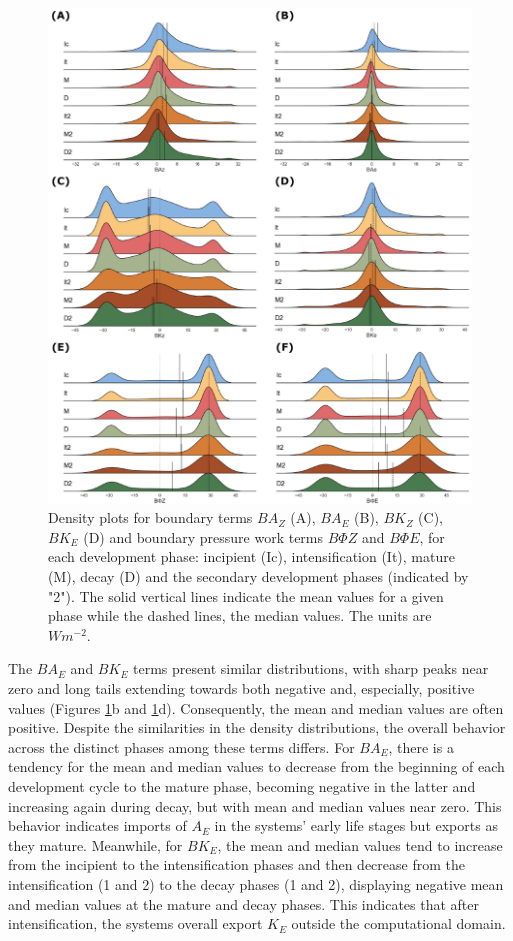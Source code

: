 \begin{figure}[!htbp]
\centering
\includegraphics[width=\textwidth]{figs_5/ridge_plot_Boundary Terms.pdf}
\caption[Density Plots - Energy Terms]{Density plots for boundary terms $BA_Z$ (A), $BA_E$ (B), $BK_Z$ (C), $BK_E$ (D) and boundary pressure work terms $B\Phi Z$ and $B\Phi E$, for each development phase: incipient (Ic), intensification (It), mature (M), decay (D) and the secondary development phases (indicated by "2"). The solid vertical lines indicate the mean values for a given phase while the dashed lines, the median values. The units are $W m^{-2}$.}
\label{fig:ridge_plot_Boundary}
\end{figure}

The $BA_E$ and $BK_E$ terms present similar distributions, with sharp peaks near zero and long tails extending towards both negative and, especially, positive values (Figures \ref{fig:ridge_plot_Boundary}b and \ref{fig:ridge_plot_Boundary}d). Consequently, the mean and median values are often positive. Despite the similarities in the density distributions, the overall behavior across the distinct phases among these terms differs. For $BA_E$, there is a tendency for the mean and median values to decrease from the beginning of each development cycle to the mature phase, becoming negative in the latter and increasing again during decay, but with mean and median values near zero. This behavior indicates imports of $A_E$ in the systems' early life stages but exports as they mature. Meanwhile, for $BK_E$, the mean and median values tend to increase from the incipient to the intensification phases and then decrease from the intensification (1 and 2) to the decay phases (1 and 2), displaying negative mean and median values at the mature and decay phases. This indicates that after intensification, the systems overall export $K_E$ outside the computational domain.

